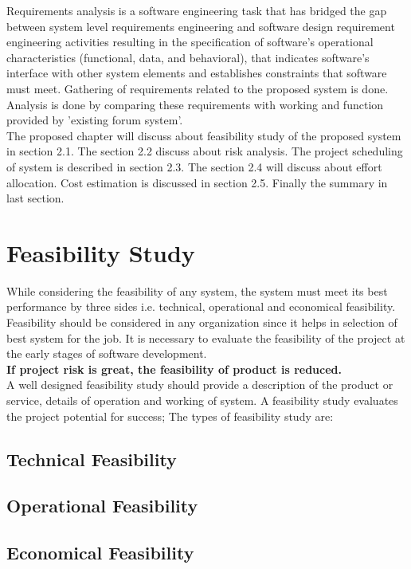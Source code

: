 Requirements analysis is a software engineering task that has bridged the gap between system level requirements engineering and software design requirement engineering activities resulting in the specification of software’s operational characteristics (functional, data, and behavioral), that indicates software’s interface with other system elements and establishes constraints that software must meet. Gathering of requirements related to the proposed system is done. Analysis is done by comparing these requirements with working and function provided by ’existing forum system’.\\ The proposed chapter will discuss about feasibility study of the proposed system in section 2.1. The section 2.2 discuss about risk analysis. The project scheduling of system is described in section 2.3. The section 2.4 will discuss about effort allocation. Cost estimation is discussed in section 2.5. Finally the summary in last section.

\section{Feasibility Study}

While considering the feasibility of any system, the system must meet its best performance by three sides i.e. technical, operational and economical feasibility. Feasibility should be considered in any organization since it helps in selection of best system for the job. It is necessary to evaluate the feasibility of the project at the early stages of software development.\\
\textbf{If project risk is great, the feasibility of product is reduced.}\\
A well designed feasibility study should provide a description of the product or service, details
of operation and working of system. A feasibility study evaluates the project potential for
success; The types of feasibility study are:
    \subsection{Technical Feasibility}
    \subsection{Operational Feasibility}
    \subsection{Economical Feasibility}

